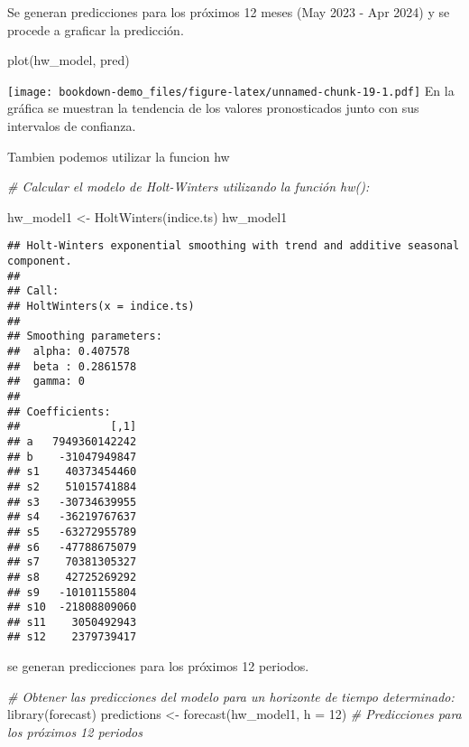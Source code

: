 \documentclass[
]{book}
\newenvironment{Shaded}{\begin{snugshade}}{\end{snugshade}}
\newcommand{\AttributeTok}[1]{\textcolor[rgb]{0.77,0.63,0.00}{#1}}
\newcommand{\CommentTok}[1]{\textcolor[rgb]{0.56,0.35,0.01}{\textit{#1}}}
\newcommand{\DecValTok}[1]{\textcolor[rgb]{0.00,0.00,0.81}{#1}}
\newcommand{\FunctionTok}[1]{\textcolor[rgb]{0.00,0.00,0.00}{#1}}
\newcommand{\NormalTok}[1]{#1}
\newcommand{\OtherTok}[1]{\textcolor[rgb]{0.56,0.35,0.01}{#1}}
\begin{document}
Se generan predicciones para los próximos 12 meses (May 2023 - Apr 2024) y se procede a graficar la predicción.

\begin{Shaded}
\begin{Highlighting}[]
\FunctionTok{plot}\NormalTok{(hw\_model, pred)}
\end{Highlighting}
\end{Shaded}

\texttt{[image: bookdown-demo\_files/figure-latex/unnamed-chunk-19-1.pdf]}
En la gráfica se muestran la tendencia de los valores pronosticados junto con sus intervalos de confianza.

Tambien podemos utilizar la funcion hw

\begin{Shaded}
\begin{Highlighting}[]
\CommentTok{\# Calcular el modelo de Holt{-}Winters utilizando la función hw():}
  
\NormalTok{hw\_model1 }\OtherTok{\textless{}{-}} \FunctionTok{HoltWinters}\NormalTok{(indice.ts)}
\NormalTok{hw\_model1}
\end{Highlighting}
\end{Shaded}

\begin{verbatim}
## Holt-Winters exponential smoothing with trend and additive seasonal component.
## 
## Call:
## HoltWinters(x = indice.ts)
## 
## Smoothing parameters:
##  alpha: 0.407578
##  beta : 0.2861578
##  gamma: 0
## 
## Coefficients:
##              [,1]
## a   7949360142242
## b    -31047949847
## s1    40373454460
## s2    51015741884
## s3   -30734639955
## s4   -36219767637
## s5   -63272955789
## s6   -47788675079
## s7    70381305327
## s8    42725269292
## s9   -10101155804
## s10  -21808809060
## s11    3050492943
## s12    2379739417
\end{verbatim}

se generan predicciones para los próximos 12 periodos.

\begin{Shaded}
\begin{Highlighting}[]
\CommentTok{\# Obtener las predicciones del modelo para un horizonte de tiempo determinado:}
\FunctionTok{library}\NormalTok{(forecast) }
\NormalTok{predictions }\OtherTok{\textless{}{-}} \FunctionTok{forecast}\NormalTok{(hw\_model1, }\AttributeTok{h =} \DecValTok{12}\NormalTok{)  }\CommentTok{\# Predicciones para los próximos 12 periodos}
\end{Highlighting}
\end{Shaded}
\end{document}
